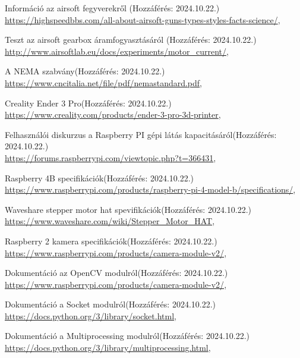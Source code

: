 \documentclass[12pt,a4paper]{article}
\begin{document}
\begin{thebibliography}{}
	Információ az airsoft fegyverekről \hfill (Hozzáférés: 2024.10.22.) \\
	{\footnotesize \url{https://highspeedbbs.com/all-about-airsoft-guns-types-styles-facts-science/}},

	
	Teszt az airsoft gearbox áramfogyasztásáról \hfill (Hozzáférés: 2024.10.22.) \\
	{\footnotesize \url{http://www.airsoftlab.eu/docs/experiments/motor_current/}},
	
	
	A NEMA szabvány\hfill (Hozzáférés: 2024.10.22.) \\
	{\footnotesize \url{https://www.cncitalia.net/file/pdf/nemastandard.pdf}},
	
	Creality Ender 3 Pro\hfill (Hozzáférés: 2024.10.22.) \\
	{\footnotesize \url{https://www.creality.com/products/ender-3-pro-3d-printer}},

	
	Felhasználói diskurzus a Raspberry PI gépi látás kapacitásáról\hfill (Hozzáférés: 2024.10.22.) \\
	{\footnotesize \url{https://forums.raspberrypi.com/viewtopic.php?t=366431}},
	
	Raspberry 4B specifikációk\hfill (Hozzáférés: 2024.10.22.) \\
	{\footnotesize \url{https://www.raspberrypi.com/products/raspberry-pi-4-model-b/specifications/}},
	
	Waveshare stepper motor hat spevifikációk\hfill (Hozzáférés: 2024.10.22.) \\
	{\footnotesize \url{https://www.waveshare.com/wiki/Stepper_Motor_HAT}},

	Raspberry 2 kamera specifikációk\hfill (Hozzáférés: 2024.10.22.) \\
	{\footnotesize \url{https://www.raspberrypi.com/products/camera-module-v2/}},
	
	Dokumentáció az OpenCV modulról\hfill (Hozzáférés: 2024.10.22.) \\
	{\footnotesize \url{https://www.raspberrypi.com/products/camera-module-v2/}},
	
	Dokumentáció a Socket modulról\hfill (Hozzáférés: 2024.10.22.) \\
	{\footnotesize \url{https://docs.python.org/3/library/socket.html}},
	
	Dokumentáció a Multiprocessing modulról\hfill (Hozzáférés: 2024.10.22.) \\
	{\footnotesize \url{https://docs.python.org/3/library/multiprocessing.html}},
	

\end{thebibliography}
\end{document}
